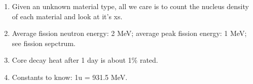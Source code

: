 \documentclass{school-22.211-notes}
\begin{document}
\begin{enumerate}
\item Given an unknown material type, all we care is to count the nucleus density of each material and look at it's xs. 
\item Average fission neutron energy: 2 MeV; average peak fission energy: 1 MeV; see fission sepctrum. 

\item Core decay heat after 1 day is about 1\% rated. 

\item Constants to know: 1u = 931.5 MeV. 
\end{enumerate}
\end{document}
